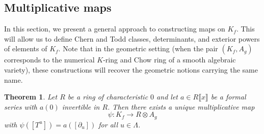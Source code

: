 \documentclass[oneside]{amsart}
\theoremstyle{plain}
\newtheorem{theorem}{Theorem}[section]
\theoremstyle{definition}
\begin{document}
\subsection{Multiplicative maps}
\label{subsec:multiplicative-maps}


In this section, we present a general approach to constructing maps on $K_f$. This will allow us to define Chern and Todd classes, determinants, and exterior powers of elements of $K_f$. Note that in the geometric setting (when the pair $(K_f, A_g)$ corresponds to the numerical $K$-ring and Chow ring of a smooth algebraic variety), these constructions will recover the geometric notions carrying the same name.

\begin{theorem}
    \label{thm:mult-map-A_g}
    Let $R$ be a ring of characteristic $0$ and let
    $a \in R \llbracket x \rrbracket$ be a formal series with $a(0)$ invertible in $R$.
    Then there exists a unique multiplicative map
    \[
        \psi\colon K_f\to R\otimes A_g
    \]
    with $\psi([T^u])=a([\partial_u])$ for all $u\in \Lambda$.    
\end{theorem}
\end{document}
